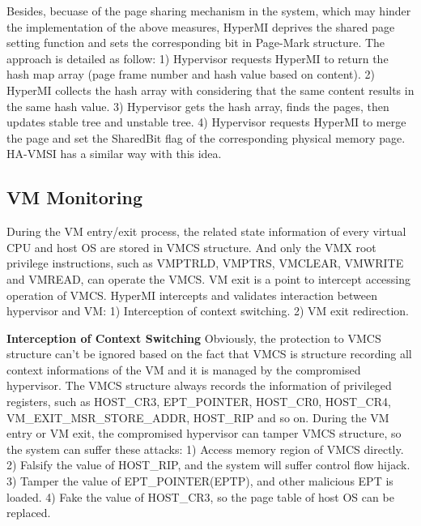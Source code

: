 \documentclass[conference]{IEEEtran}
\begin{document}
Besides, becuase of the page sharing mechanism in the system, which may hinder the implementation of the above measures, HyperMI deprives the shared page setting function and sets the corresponding bit in Page-Mark structure. 
The approach is detailed as follow: 1) Hypervisor requests HyperMI to return the hash map array (page frame number and hash value based on content). 2) HyperMI collects the hash array with considering that the same content results in the same hash value. 3) Hypervisor gets the hash array, finds the pages, then updates stable tree and unstable tree. 4) Hypervisor requests HyperMI to merge the page and set the SharedBit flag of the corresponding physical memory page. HA-VMSI \cite{Zhu2017HA} has a similar way with this idea.


\subsection{VM Monitoring}

During the VM entry/exit process, the related state information of every virtual CPU and host OS are stored in VMCS structure. 
And only the VMX root privilege instructions, such as VMPTRLD, VMPTRS, VMCLEAR, VMWRITE and VMREAD, can operate the VMCS.
VM exit is a point to intercept accessing operation of VMCS. HyperMI intercepts and validates interaction between hypervisor and VM: 1) Interception of context switching. 2) VM exit redirection.

\textbf{Interception of Context Switching}
Obviously, the protection to VMCS structure can't be ignored based on the fact that VMCS is structure recording all context informations of the VM and it is managed by the compromised hypervisor. 
The VMCS structure always records the information of privileged registers, such as HOST\_CR3, EPT\_POINTER, HOST\_CR0, HOST\_CR4, VM\_EXIT\_MSR\_STORE\_ADDR, HOST\_RIP and so on. During the VM entry or VM exit, the compromised hypervisor can tamper VMCS structure, so the system can suffer these attacks: 1) Access memory region of VMCS directly. 2) Falsify the value of HOST\_RIP, and the system will suffer control flow hijack. 3) Tamper the value of EPT\_POINTER(EPTP), and other malicious EPT is loaded. 4) Fake the value of HOST\_CR3, so the page table of host OS can be replaced.
\end{document}
